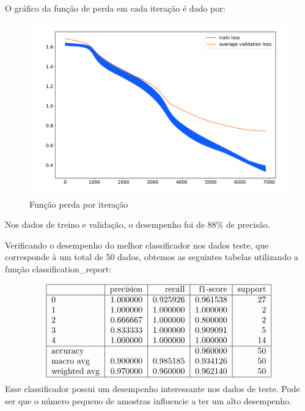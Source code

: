 \documentclass[12pt,a4paper]{article}
\theoremstyle{definition}
\theoremstyle{theoremdd}
\begin{document}
O gráfico da função de perda em cada iteração é dado por:
\begin{center}
\begin{figure}[H]
	\centering
	\includegraphics[height=0.667\textwidth,width=\textwidth]{Classification_NN_training_loss.pdf}
	\caption{Função perda por iteração}
	\label{fig:02}
\end{figure}
\end{center}

Nos dados de treino e validação, o desempenho foi de $88\%$ de precisão.

Verificando o desempenho do melhor classificador nos dados teste, que corresponde à um total de 50 dados, obtemos as seguintes tabelas utilizando a função classification\_report:

\begin{displaymath}
\begin{tabular}{|l|r|r|r|r|}
\hline
{} &  precision &    recall &  f1-score &  support \\
\hline
0            &   1.000000 &  0.925926 &  0.961538 &    27 \\
1            &   1.000000 &  1.000000 &  1.000000 &     2 \\
2            &   0.666667 &  1.000000 &  0.800000 &     2 \\
3            &   0.833333 &  1.000000 &  0.909091 &     5 \\
4            &   1.000000 &  1.000000 &  1.000000 &    14 \\ \hline
accuracy     &   {} &  {} &  0.960000 &     50 \\
macro avg    &   0.900000 &  0.985185 &  0.934126 &    50 \\
weighted avg &   0.970000 &  0.960000 &  0.962140 &    50 \\
\hline
\end{tabular}
\end{displaymath}
Esse classificador possui um desempenho interessante nos dados de teste. Pode ser que o número pequeno de amostras influencie a ter um alto desempenho.
\end{document}
